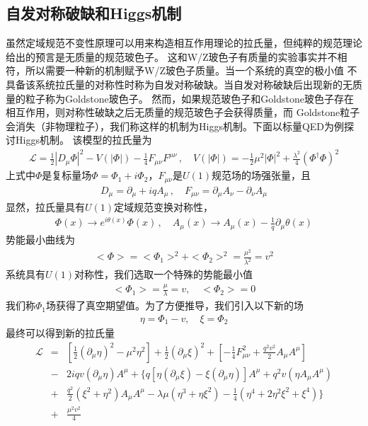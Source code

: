 \subsection{自发对称破缺和Higgs机制}
虽然定域规范不变性原理可以用来构造相互作用理论的拉氏量，但纯粹的规范理论给出的预言是无质量的规范玻色子。
这和W/Z玻色子有质量的实验事实并不相符，所以需要一种新的机制赋予W/Z玻色子质量。当一个系统的真空的极小值
不具备该系统拉氏量的对称性时称为自发对称破缺。当自发对称破缺后出现新的无质量的粒子称为Goldstone玻色子。
然而，如果规范玻色子和Goldstone玻色子存在相互作用，则对称性破缺之后无质量的规范玻色子会获得质量，而
Goldstone粒子会消失（非物理粒子），我们称这样的机制为Higgs机制。下面以标量QED为例探讨Higgs机制。
该模型的拉氏量为
\begin{eqnarray}
\mathscr{L} = \frac{1}{2}|D_{\mu}\Phi|^2 - V(|\Phi|) - \frac{1}{4}F_{\mu\nu}F^{\mu\nu} \,, \quad
V(|\Phi|)  = -\frac{1}{2}\mu^2 |\Phi|^2 + \frac{\lambda^2}{4}(\Phi^{\dagger}\Phi)^2
\end{eqnarray}
上式中$\Phi$是复标量场$\Phi=\Phi_1+i\Phi_2$，$F_{\mu\nu}$是$U(1)$规范场的场强张量，且
\begin{eqnarray}
D_{\mu} = \partial_{\mu} + iqA_{\mu}\, , \quad F_{\mu\nu} = \partial_{\mu}A_{\nu}-\partial_{\nu}A_{\mu}
\end{eqnarray}
显然，拉氏量具有$U(1)$定域规范变换对称性，
\begin{eqnarray}
\Phi(x) \to e^{i\theta(x)}\Phi(x)\, , \quad A_{\mu}(x) \to A_{\mu}(x) -\frac{1}{q}\partial_{\mu}\theta(x)
\end{eqnarray}
势能最小曲线为
\begin{eqnarray}
<\Phi> = <\Phi_1>^2 + <\Phi_2>^2 = \frac{\mu^2}{\lambda^2} = v^2
\end{eqnarray}
系统具有$U(1)$对称性，我们选取一个特殊的势能最小值
\begin{eqnarray}
<\Phi_1> = \frac{\mu}{\lambda} = v , \quad <\Phi_2> = 0
\end{eqnarray}
我们称$\Phi_1$场获得了真空期望值。为了方便推导，我们引入以下新的场
\begin{eqnarray}
\eta = \Phi_1 - v , \quad \xi = \Phi_2
\end{eqnarray}
最终可以得到新的拉氏量
\begin{eqnarray}
\mathscr{L} &=& \left[\frac{1}{2}(\partial_{\mu}\eta)^2 - \mu^2 \eta^2\right] + 
\frac{1}{2}(\partial_{\mu}\xi)^2 + \left[-\frac{1}{4}F^2_{\mu\nu} + \frac{q^2v^2}{2}A_{\mu}A^{\mu}\right]
\nonumber \\
&-& 2iqv(\partial_{\mu}\eta)A^{\mu} + \Big\{ q[\eta(\partial_{\mu}\xi)-\xi(\partial_{\mu}\eta)]A^{\mu} 
+ q^2v(\eta A_{\mu}A^{\mu}) 
\nonumber \\
&+& \frac{q^2}{2}(\xi^2 + \eta^2)A_{\mu}A^{\mu} - \lambda\mu(\eta^3 + \eta\xi^2) - 
\frac{1}{4}(\eta^4 + 2\eta^2\xi^2 + \xi^4) \Big\}
\nonumber \\
&+& \frac{\mu^2v^2}{4}
\end{eqnarray}
